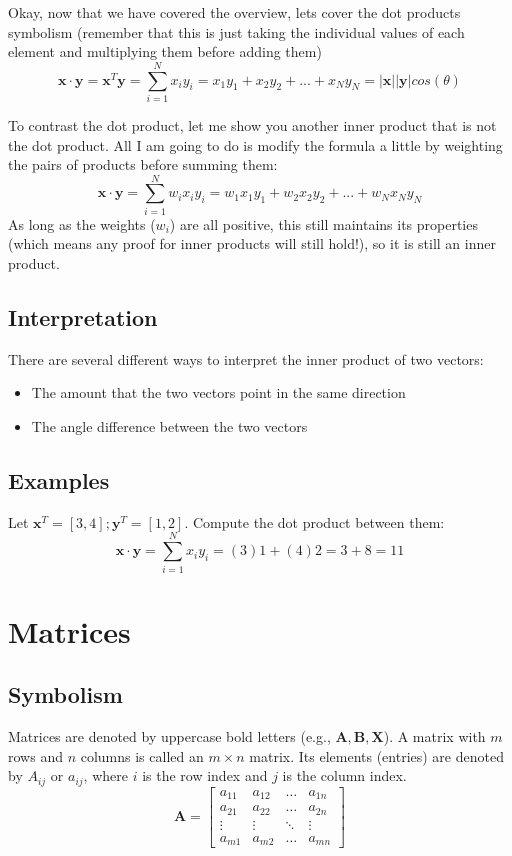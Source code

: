 \documentclass{article}
\newcommand{\vect}[1]{\bm{#1}} %
\newcommand{\mat}[1]{\bm{#1}}  %
\begin{document}
Okay, now that we have covered the overview, lets cover the dot products symbolism (remember that this is just taking the individual values of each element and multiplying them before adding them)
\[
\vect{x} \cdot \vect{y} = \vect{x}^{T}\vect{y}=\sum_{i=1}^{N}x_{i}y_{i}= x_{1}y_{1} + x_{2}y_{2}+...+x_{N}y_{N} =|\vect{x}| |\vect{y}|cos(\theta)
\]

To contrast the dot product, let me show you another inner product that is not the dot product. All I am going to do is modify the formula a little by weighting the pairs of products before summing them:
\[
\vect{x} \cdot \vect{y} = \sum_{i=1}^{N} w_{i}x_{i}y_{i}= w_{1}x_{1}y_{1} + w_{2}x_{2}y_{2}+...+w_{N}x_{N}y_{N}
\]
As long as the weights ($w_{i}$) are all positive, this still maintains its properties (which means any proof for inner products will still hold!), so it is still an inner product.

\subsection*{Interpretation}
There are several different ways to interpret the inner product of two vectors:
\begin{itemize}
    \item The amount that the two vectors point in the same direction
    \item The angle difference between the two vectors
\end{itemize}


\subsection*{Examples}
Let $\vect{x}^{T} = [3,4]; \vect{y}^{T} = [1,2]$. Compute the dot product between them:
\[
\vect{x} \cdot \vect{y} = \sum_{i=1}^{N}x_{i}y_{i} = (3)1 + (4)2 = 3+8 = 11
\]


\section{Matrices}

\subsection*{Symbolism}
Matrices are denoted by uppercase bold letters (e.g., $\mat{A}, \mat{B}, \mat{X}$). A matrix with $m$ rows and $n$ columns is called an $m \times n$ matrix. Its elements (entries) are denoted by $A_{ij}$ or $a_{ij}$, where $i$ is the row index and $j$ is the column index.
\[ \mat{A} = \begin{bmatrix}
    a_{11} & a_{12} & \dots & a_{1n} \\
    a_{21} & a_{22} & \dots & a_{2n} \\
    \vdots & \vdots & \ddots & \vdots \\
    a_{m1} & a_{m2} & \dots & a_{mn}
\end{bmatrix} \]
\end{document}

